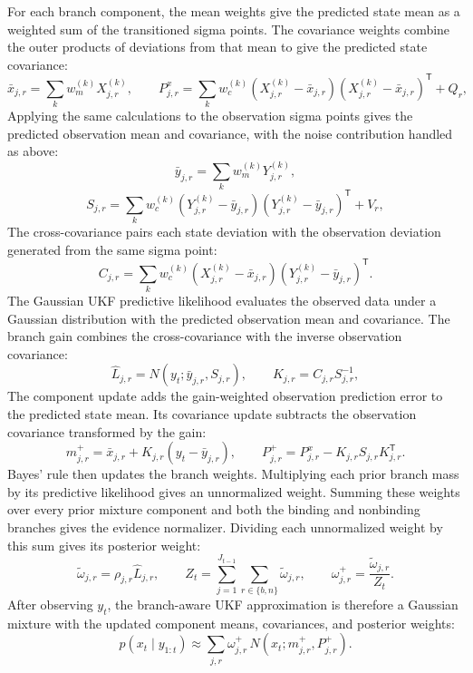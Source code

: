\documentclass[11pt]{article}
\begin{document}
For each branch component, the mean weights give the predicted state mean as a weighted sum of the transitioned sigma points. The covariance weights combine the outer products of deviations from that mean to give the predicted state covariance:
\begin{equation}\label{eq:39}
 \bar x_{j,r}=\sum_k w_m^{(k)}X_{j,r}^{(k)},
 \qquad
 P^x_{j,r}=\sum_k w_c^{(k)}
 (X_{j,r}^{(k)}-\bar x_{j,r})(X_{j,r}^{(k)}-\bar x_{j,r})^{\mathsf T}+Q_r,
\end{equation}
Applying the same calculations to the observation sigma points gives the predicted observation mean and covariance, with the noise contribution handled as above:
\begin{equation}\label{eq:40}
 \bar y_{j,r}=\sum_k w_m^{(k)}Y_{j,r}^{(k)},
\end{equation}
\begin{equation}\label{eq:41}
 S_{j,r}=\sum_k w_c^{(k)}
 (Y_{j,r}^{(k)}-\bar y_{j,r})(Y_{j,r}^{(k)}-\bar y_{j,r})^{\mathsf T}+V_r,
\end{equation}
The cross-covariance pairs each state deviation with the observation deviation generated from the same sigma point:
\begin{equation}\label{eq:42}
 C_{j,r}=\sum_k w_c^{(k)}
 (X_{j,r}^{(k)}-\bar x_{j,r})(Y_{j,r}^{(k)}-\bar y_{j,r})^{\mathsf T}.
\end{equation}
The Gaussian UKF predictive likelihood evaluates the observed data under a Gaussian distribution with the predicted observation mean and covariance. The branch gain combines the cross-covariance with the inverse observation covariance:
\begin{equation}\label{eq:43}
 \widehat L_{j,r}=N(y_t;\bar y_{j,r},S_{j,r}),
 \qquad K_{j,r}=C_{j,r}S_{j,r}^{-1},
\end{equation}
The component update adds the gain-weighted observation prediction error to the predicted state mean. Its covariance update subtracts the observation covariance transformed by the gain:
\begin{equation}\label{eq:44}
 m^+_{j,r}=\bar x_{j,r}+K_{j,r}(y_t-\bar y_{j,r}),
 \qquad
 P^+_{j,r}=P^x_{j,r}-K_{j,r}S_{j,r}K_{j,r}^{\mathsf T}.
\end{equation}
Bayes' rule then updates the branch weights. Multiplying each prior branch mass by its predictive likelihood gives an unnormalized weight. Summing these weights over every prior mixture component and both the binding and nonbinding branches gives the evidence normalizer. Dividing each unnormalized weight by this sum gives its posterior weight:
\begin{equation}\label{eq:45}
 \widetilde\omega_{j,r}=\rho_{j,r}\widehat L_{j,r},
 \qquad
 Z_t=\sum_{j=1}^{J_{t-1}}\sum_{r\in\{b,n\}}\widetilde\omega_{j,r},
 \qquad
 \omega^+_{j,r}=\frac{\widetilde\omega_{j,r}}{Z_t}.
\end{equation}
After observing $y_t$, the branch-aware UKF approximation is therefore a Gaussian mixture with the updated component means, covariances, and posterior weights:
\begin{equation}\label{eq:46}
 p(x_t\mid y_{1:t})
 \approx\sum_{j,r}\omega^+_{j,r}\,
 N(x_t;m^+_{j,r},P^+_{j,r}).
\end{equation}
\end{document}
